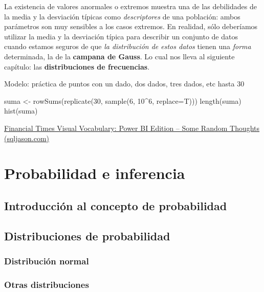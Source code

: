 \documentclass[
  letterpaper,
]{scrbook}
\begin{document}
La existencia de valores anormales o extremos muestra una de las
debilidades de la media y la desviación típicas como \emph{descriptores}
de una población: ambos parámetros son muy sensibles a los casos
extremos. En realidad, sólo deberíamos utilizar la media y la desviación
típica para describir un conjunto de datos cuando estamos seguros de que
\emph{la distribución de estos datos} tienen una \emph{forma}
determinada, la de la \textbf{campana de Gauss}. Lo cual nos lleva al
siguiente capítulo: las \textbf{distribuciones de frecuencias}.

Modelo: práctica de puntos con un dado, dos dados, tres dados, etc hasta
30

suma \textless- rowSums(replicate(30, sample(6, 10\^{}6, replace=T)))
length(suma) hist(suma)

\href{http://sqljason.com/2018/12/financial-times-visual-vocabulary-power-bi-edition.html}{Financial
Times Visual Vocabulary: Power BI Edition -- Some Random Thoughts
(sqljason.com)}


\hypertarget{probabilidad-e-inferencia}{%
\chapter{Probabilidad e inferencia}\label{probabilidad-e-inferencia}}

\hypertarget{introducciuxf3n-al-concepto-de-probabilidad}{%
\section{Introducción al concepto de
probabilidad}\label{introducciuxf3n-al-concepto-de-probabilidad}}

\hypertarget{distribuciones-de-probabilidad}{%
\section{Distribuciones de
probabilidad}\label{distribuciones-de-probabilidad}}

\hypertarget{distribuciuxf3n-normal}{%
\subsection{Distribución normal}\label{distribuciuxf3n-normal}}

\hypertarget{otras-distribuciones}{%
\subsection{Otras distribuciones}\label{otras-distribuciones}}
\end{document}
